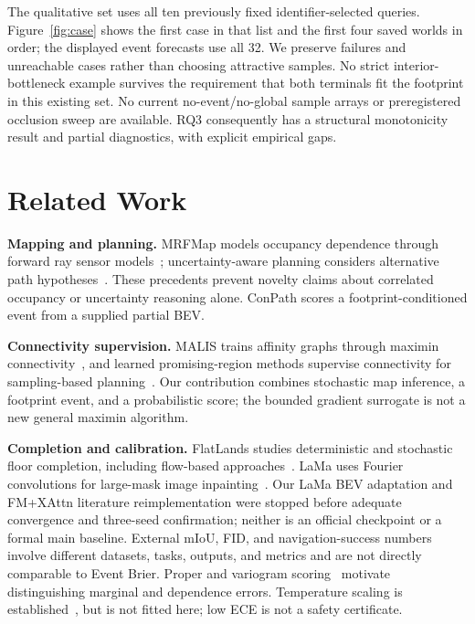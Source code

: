\documentclass[conference,letterpaper,10pt]{IEEEtran}
\begin{document}
The qualitative set uses all ten previously fixed identifier-selected queries. Figure~\ref{fig:case} shows the first case in that list and the first four saved worlds in order; the displayed event forecasts use all 32. We preserve failures and unreachable cases rather than choosing attractive samples. No strict interior-bottleneck example survives the requirement that both terminals fit the footprint in this existing set. No current no-event/no-global sample arrays or preregistered occlusion sweep are available. RQ3 consequently has a structural monotonicity result and partial diagnostics, with explicit empirical gaps.



\section{Related Work}
\textbf{Mapping and planning.} MRFMap models occupancy dependence through forward ray sensor models~\cite{shankar2020mrfmap}; uncertainty-aware planning considers alternative path hypotheses~\cite{banfi2022uncertainty}. These precedents prevent novelty claims about correlated occupancy or uncertainty reasoning alone. ConPath scores a footprint-conditioned event from a supplied partial BEV.

\textbf{Connectivity supervision.} MALIS trains affinity graphs through maximin connectivity~\cite{turaga2009malis}, and learned promising-region methods supervise connectivity for sampling-based planning~\cite{ma2022connectivity}. Our contribution combines stochastic map inference, a footprint event, and a probabilistic score; the bounded gradient surrogate is not a new general maximin algorithm.

\textbf{Completion and calibration.} FlatLands studies deterministic and stochastic floor completion, including flow-based approaches~\cite{bhattacharjee2026flatlands}. LaMa uses Fourier convolutions for large-mask image inpainting~\cite{suvorov2022lama}. Our LaMa BEV adaptation and FM+XAttn literature reimplementation were stopped before adequate convergence and three-seed confirmation; neither is an official checkpoint or a formal main baseline. External mIoU, FID, and navigation-success numbers involve different datasets, tasks, outputs, and metrics and are not directly comparable to Event Brier. Proper and variogram scoring~\cite{gneiting2007proper,scheuerer2015variogram} motivate distinguishing marginal and dependence errors. Temperature scaling is established~\cite{guo2017calibration}, but is not fitted here; low ECE is not a safety certificate.
\end{document}
